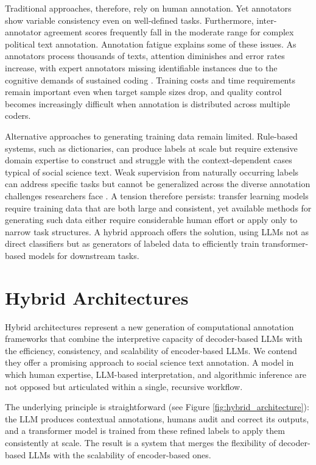\documentclass[12pt]{article}
\begin{document}
Traditional approaches, therefore, rely on human annotation. Yet annotators show variable consistency even on well-defined tasks. Furthermore, inter-annotator agreement scores frequently fall in the moderate range for complex political text annotation. Annotation fatigue explains some of these issues. As annotators process thousands of texts, attention diminishes and error rates increase, with expert annotators missing identifiable instances  due to the cognitive demands of sustained coding \parencite{do_etal24}. Training costs and time requirements remain important even when target sample sizes drop, and quality control becomes increasingly difficult when annotation is distributed across multiple coders.

Alternative approaches to generating training data remain limited. Rule-based systems, such as dictionaries, can produce labels at scale but require extensive domain expertise to construct and struggle with the context-dependent cases typical of social science text. Weak supervision from naturally occurring labels can address specific tasks but cannot be generalized across the diverse annotation challenges researchers face \parencite{matsuo_fukumoto25}. A tension therefore persists: transfer learning models require training data that are both large and consistent, yet available methods for generating such data either require considerable human effort or apply only to narrow task structures. A hybrid approach offers the solution, using LLMs not as direct classifiers but as generators of labeled data to efficiently train transformer-based models for downstream tasks.

\section{Hybrid Architectures}

Hybrid architectures represent a new generation of computational annotation frameworks that combine the interpretive capacity of decoder-based LLMs with the efficiency, consistency, and scalability of encoder-based LLMs. We contend they offer a promising approach to social science text annotation. A model in which human expertise, LLM-based interpretation, and algorithmic inference are not opposed but articulated within a single, recursive workflow. 

The underlying principle is straightforward (see Figure \ref{fig:hybrid_architecture}): the LLM produces contextual annotations, humans audit and correct its outputs, and a transformer model is trained from these refined labels to apply them consistently at scale. The result is a system that merges the flexibility of decoder-based LLMs with the scalability of encoder-based ones.
\end{document}
